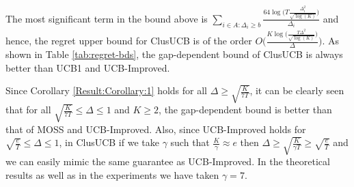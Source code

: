 
The most significant term in the bound above is $\sum_{i\in A:\Delta_{i}\geq b}\frac{64\log{\big(T\frac{\Delta_{i}^{2}}{\sqrt{\log (K)}}\big)}}{\Delta_{i}}$ and hence, the regret upper bound for ClusUCB is of the order $O\bigg(\frac{K\log \big(\frac{T\Delta^{2}}{\sqrt{\log (K)}}\big)}{\Delta}\bigg)$. As shown in Table \ref{tab:regret-bds}, the gap-dependent bound of ClusUCB is always better than UCB1 and UCB-Improved. 


Since Corollary \ref{Result:Corollary:1} holds for all $\Delta \geq \sqrt{\frac{K}{7T}} $, it can be clearly seen that for all $\sqrt{\frac{K}{7T}} \leq \Delta\leq 1$ and $K\geq 2$, the gap-dependent bound is better than that of MOSS and UCB-Improved. Also, since UCB-Improved holds for $\sqrt{\frac{e}{T}}\leq \Delta\leq 1$, in ClusUCB if we take $\gamma$ such that $\frac{K}{\gamma}\approx e$ then $\Delta\geq\sqrt{\frac{K}{\gamma T}}\geq \sqrt{\frac{e}{T}}$ and we can easily mimic the same guarantee as UCB-Improved. In the theoretical results as well as in the experiments we have taken $\gamma =7$. 


